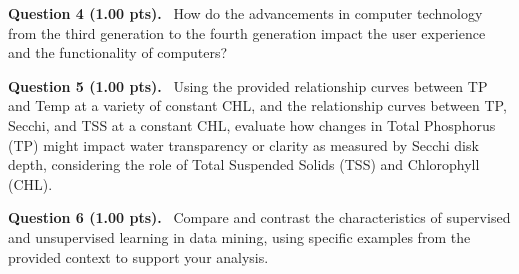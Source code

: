 \documentclass[12pt,a4paper]{article}
\begin{document}
\noindent
\textbf{Question 4 (1.00 pts).}~
How do the advancements in computer technology from the third generation to the fourth generation impact the user experience and the functionality of computers?


\vspace{0.4cm}
\noindent\makebox[\linewidth]{\hrulefill}
\vspace{0.6cm}



\vspace{0.5em}


\noindent
\textbf{Question 5 (1.00 pts).}~
Using the provided relationship curves between TP and Temp at a variety of constant CHL, and the relationship curves between TP, Secchi, and TSS at a constant CHL, evaluate how changes in Total Phosphorus (TP) might impact water transparency or clarity as measured by Secchi disk depth, considering the role of Total Suspended Solids (TSS) and Chlorophyll (CHL).


\vspace{0.4cm}
\noindent\makebox[\linewidth]{\hrulefill}
\vspace{0.4cm}
\noindent\makebox[\linewidth]{\hrulefill}
\vspace{0.4cm}
\noindent\makebox[\linewidth]{\hrulefill}
\vspace{0.6cm}



\vspace{0.5em}


\noindent
\textbf{Question 6 (1.00 pts).}~
Compare and contrast the characteristics of supervised and unsupervised learning in data mining, using specific examples from the provided context to support your analysis.


\vspace{0.4cm}
\noindent\makebox[\linewidth]{\hrulefill}
\vspace{0.4cm}
\noindent\makebox[\linewidth]{\hrulefill}
\vspace{0.4cm}
\noindent\makebox[\linewidth]{\hrulefill}
\vspace{0.6cm}
\end{document}

